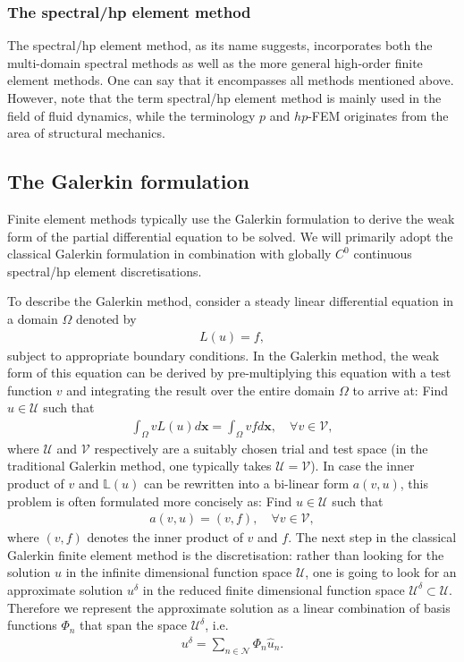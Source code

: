 \subsubsection{The spectral/hp element method}

The spectral/hp element method, as its name suggests, incorporates both the
multi-domain spectral methods as well as the more general high-order finite
element methods. One can say that it encompasses all methods mentioned above.
However, note that the term spectral/hp element method is mainly used in the
field of fluid dynamics, while the terminology $p$ and $hp$-FEM originates
from the area of structural mechanics.


\subsection{The Galerkin formulation}

Finite element methods typically use the Galerkin formulation to derive the weak
form of the partial differential equation to be solved. We will primarily adopt
the classical Galerkin formulation in combination with globally $C^0$
 continuous spectral/hp element discretisations.

To describe the Galerkin method, consider a steady linear differential equation
in a domain $\Omega$ denoted by
\begin{align*}
L(u)=f,
\end{align*}
subject to appropriate boundary conditions. In the Galerkin method, the weak
form of this equation can be derived by pre-multiplying this equation with a
test function $v$ and integrating the result over the entire domain 
$\Omega$ to arrive at: Find $u\in\mathcal{U}$ such that
\begin{align*}
\int_\Omega vL(u)d\boldsymbol{x}=\int_\Omega v f d\boldsymbol{x}, \quad \forall
v\in\mathcal{V},
\end{align*}
where $\mathcal{U}$ and $\mathcal{V}$ respectively are a
suitably chosen trial and test space (in the traditional Galerkin method, one 
typically takes $\mathcal{U}=\mathcal{V}$). In case the inner product of
$v$ and $\mathbb{L}(u)$ can be rewritten into a bi-linear form
$a(v,u)$, this problem is often formulated more concisely as: Find
$u\in\mathcal{U}$ such that
\begin{align*}
a(v,u)=(v,f),\quad \forall v\in\mathcal{V},
\end{align*}
where $(v,f)$ denotes the inner product of $v$ and $f$. The next step in the
classical Galerkin finite element method is the discretisation: rather than 
looking for the solution $u$ in the infinite dimensional function space
$\mathcal{U}$, one is going to look for an approximate solution $u^\delta$ in
the reduced finite dimensional function space
$\mathcal{U}^\delta\subset\mathcal{U}$. Therefore we represent the approximate
solution as a linear combination of basis functions $\Phi_n$ that span the space
$\mathcal{U}^\delta$, i.e.
\begin{align*}
u^\delta=\sum_{n\in\mathcal{N}}\Phi_n\hat{u}_n.
\end{align*}

